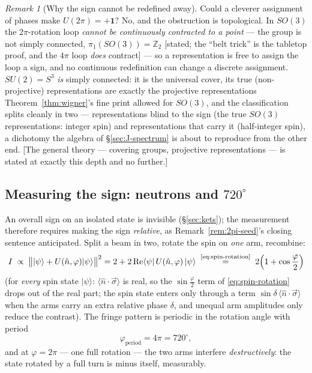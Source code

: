 \documentclass[11pt]{article}
\theoremstyle{plain}
\theoremstyle{definition}
\theoremstyle{remark}
\newtheorem{remark}[theorem]{Remark}
\newcommand{\idop}{\mathbf{1}}  %
\newcommand{\ket}[1]{\lvert #1 \rangle}
\newcommand{\bra}[1]{\langle #1 \rvert}
\begin{document}
\begin{remark}[Why the sign cannot be redefined away]
\label{rem:topology}
Could a cleverer assignment of phases make $U(2\pi) = +\idop$? No,
and the obstruction is topological. In $SO(3)$ the $2\pi$-rotation
loop \emph{cannot be continuously contracted to a point} --- the
group is not simply connected, $\pi_1(SO(3)) = \mathbb Z_2$
[stated; the ``belt trick'' is the tabletop proof, and the
$4\pi$ loop \emph{does} contract] --- so a representation is free
to assign the loop a sign, and no continuous redefinition can
change a discrete assignment. $SU(2) = S^3$ \emph{is} simply
connected: it is the universal cover, its true (non-projective)
representations
are exactly the projective representations
Theorem~\ref{thm:wigner}'s fine print allowed for $SO(3)$, and the
classification splits cleanly in two --- representations blind to
the sign (the true $SO(3)$ representations: integer spin) and
representations that carry it (half-integer spin), a dichotomy the
algebra of \S\ref{sec:J-spectrum} is about to reproduce from the
other end. [The general theory --- covering groups, projective
representations --- is stated at exactly this depth and no
further.]
\end{remark}

\subsection{Measuring the sign: neutrons and $720^\circ$}
\label{sec:neutron}

An overall sign on an isolated state is invisible
(\S\ref{sec:kets}); the measurement therefore requires making the
sign \emph{relative}, as Remark~\ref{rem:2pi-seed}'s closing
sentence anticipated. Split a beam in two, rotate the spin on
\emph{one}
arm, recombine:
\begin{equation}
  I \;\propto\;
  \bigl\|\ket\psi + U(\hat n, \varphi)\ket\psi\bigr\|^2
  = 2 + 2\operatorname{Re}
    \bra\psi\,U(\hat n, \varphi)\,\ket\psi
  \;\overset{\text{\eqref{eq:spin-rotation}}}{=}\;
  2\Bigl(1 + \cos\frac\varphi2\Bigr)
  \label{eq:interference-fringe}
\end{equation}
(for \emph{every} spin state $\ket\psi$: $\langle\hat n\cdot\vec
\sigma\rangle$ is real, so the $\sin\frac\varphi2$ term of
\eqref{eq:spin-rotation} drops out of the real part; the spin state
enters only through a term $\sin\delta\,\langle\hat n\cdot\vec
\sigma\rangle$ when the arms carry an extra relative phase $\delta$,
and unequal arm amplitudes only reduce the contrast). The fringe
pattern is
periodic in the rotation angle with period
\begin{equation}
  \varphi_{\text{period}} = 4\pi = 720^\circ,
\end{equation}
and at $\varphi = 2\pi$ --- one full rotation --- the two arms
interfere \emph{destructively}: the state rotated by a full turn is
minus itself, measurably.
\end{document}
